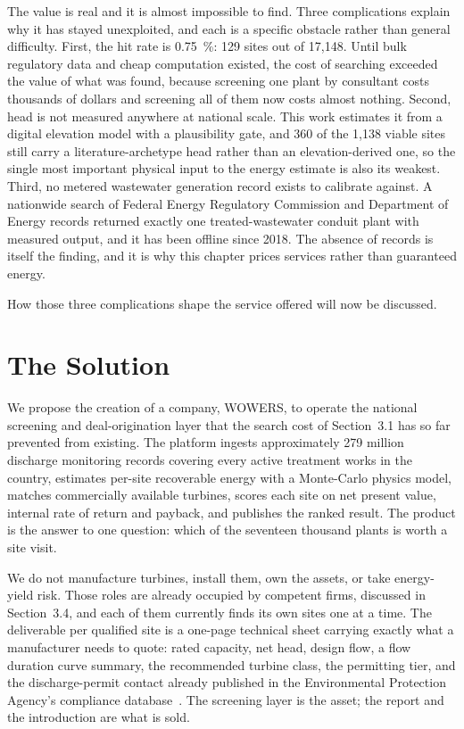 \documentclass[12pt,letterpaper]{report}
\begin{document}
The value is real and it is almost impossible to find. Three complications explain
why it has stayed unexploited, and each is a specific obstacle rather than general
difficulty. First, the hit rate is 0.75~\%: 129 sites out of 17,148. Until
bulk regulatory data and cheap computation existed, the cost of searching exceeded
the value of what was found, because screening one plant by consultant costs
thousands of dollars and screening all of them now costs almost nothing. Second,
head is not measured anywhere at national scale. This work estimates it
from a digital elevation model with a plausibility gate, and 360 of the 1,138
viable sites still carry a literature-archetype head rather than an
elevation-derived one, so the single most important
physical input to the energy estimate is also its weakest. Third, no metered
wastewater generation record exists to calibrate against. A nationwide search of
Federal Energy Regulatory Commission and Department of Energy records returned
exactly one treated-wastewater conduit plant with measured output, and it has been
offline since 2018. The absence of records is itself the finding, and it is why this
chapter prices services rather than guaranteed energy.

How those three complications shape the service offered will now be discussed.

\section{The Solution}

We propose the creation of a company, WOWERS, to operate the national screening and
deal-origination layer that the search cost of Section~3.1 has so far prevented from
existing. The platform ingests approximately 279 million discharge monitoring
records covering every active treatment works in the country, estimates per-site
recoverable energy with a Monte-Carlo physics model, matches commercially available
turbines, scores each site on net present value, internal rate of return and
payback, and publishes the ranked result. The product is the answer to one question:
which of the seventeen thousand plants is worth a site visit.

We do not manufacture turbines, install them, own the assets, or take energy-yield
risk. Those roles are already occupied by competent firms, discussed in
Section~3.4, and each of them currently finds its own sites one at a time. The
deliverable per qualified site is a one-page technical sheet carrying exactly what a
manufacturer needs to quote: rated capacity, net head, design flow, a flow
duration curve summary, the recommended turbine class, the permitting tier, and the
discharge-permit contact already published in the Environmental Protection Agency's
compliance database~\cite{epa_echo}. The screening layer is the asset; the report
and the introduction are what is sold.
\end{document}
